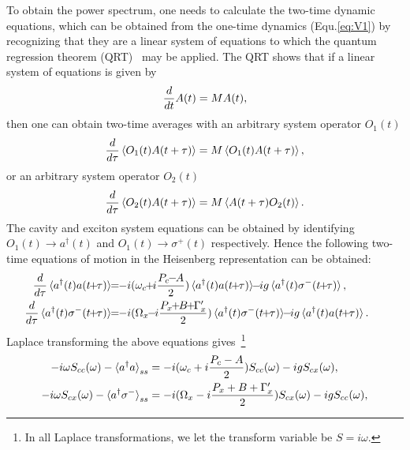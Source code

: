 

To obtain the power spectrum, one needs to calculate the two-time dynamic equations, which can be obtained from the one-time dynamics (Equ.\eqref{eq:V1}) by recognizing that they are a linear system of equations to which the quantum regression theorem (QRT)~\cite{Reboul2009} may be applied.  The QRT shows that if a linear system of equations is given by
\begin{align}
 \frac{d}{dt} A(t) = MA(t),
\end{align}
then one can obtain two-time averages with an arbitrary system operator $O_1(t)$
\begin{align}
 \frac{d}{d\tau} \mathinner{\langle{O_1(t)A(t+\tau)}\rangle}=M\mathinner{\langle{O_1(t)A(t+\tau)}\rangle},
\end{align}
or an arbitrary system operator $O_2(t)$
\begin{align}
 \frac{d}{d\tau} \mathinner{\langle{O_2(t)A(t+\tau)}\rangle}=M\mathinner{\langle{A(t+\tau)O_2(t)}\rangle}.
\end{align}
The cavity and exciton system equations can be obtained by identifying $O_1(t)\rightarrow a^\dagger(t)$ and $O_1(t)\rightarrow \sigma^{+}(t)$ respectively.  Hence the following two-time equations of motion in the Heisenberg representation can be obtained:
\begin{align}
 \!\!\!\!\!\!\!\!\! \dtau \braket{\adag(t)a(t\!\!+\!\! \tau)} \!\! &=\!\! -i(\omega_c \!\!+\!\! i\frac{P_c\!\!-\!\! A}{2})\braket{\adag(t)a(t\!\! +\!\! \tau)}\!\! -\!\! ig\braket{\adag(t)\sigm(t\!\! +\!\! \tau)},\\
 \!\!\!\!\!\!\!\!\! \dtau \braket{\adag(t)\sigm(t\!\! + \!\! \tau)} \!\! &=\!\! -i(\Omega_{x}\!\!-\!\! i\frac{P_{x}\!\! +\!\! B\!\!+\!\! \Gamma_{x}^{\prime}}{2})\braket{\adag(t)\sigm(t\!\!+\!\! \tau)}\!\!-\!\! ig\braket{\adag(t)a(t\!\!+\!\!\tau)}.
\end{align}
Laplace transforming the above equations gives~\footnote{In all Laplace transformations, we let the transform variable be $S=i\omega$.}
\begin{align}\label{eq:laplace_1}
 -i\omega S_{cc}(\omega)-\mathinner{\langle{a^{\dagger}a}\rangle}_{ss}&=-i(\omega_c+i\frac{P_c-A}{2}) S_{cc}(\omega)-ig S_{cx}(\omega),\\
 -i\omega S_{cx}(\omega)-\mathinner{\langle{a^{\dagger}\sigma^{-}}\rangle}_{ss}&=-i(\Omega_{x}-i\frac{P_x+B+\Gamma_{x}^{\prime}}{2}) S_{cx}(\omega)-igS_{cc}(\omega),\label{eq:laplace_2}
\end{align}
